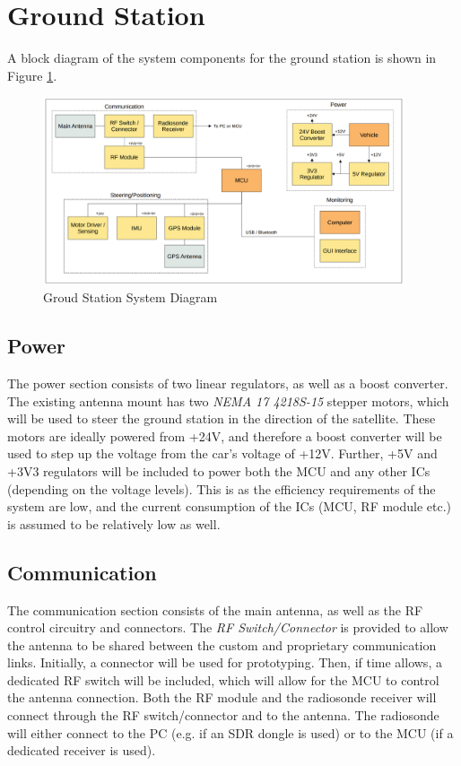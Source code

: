 \graphicspath{{./figures}}

\section{Ground Station}
A block diagram of the system components for the ground station is shown in Figure \ref{fig:gs_system}.

\begin{figure}[!htb]
  \centering
  \includegraphics[width=0.95\textwidth]{gs_system}
  \caption{Groud Station System Diagram}
  \label{fig:gs_system}
\end{figure}

\subsection{Power}
The power section consists of two linear regulators, as well as a boost converter. The existing antenna mount has two \textit{NEMA 17 4218S-15} stepper motors, which will be used to steer the ground station in the direction of the satellite. These motors are ideally powered from +24V, and therefore a boost converter will be used to step up the voltage from the car's voltage of +12V. Further, +5V and +3V3 regulators will be included to power both the MCU and any other ICs (depending on the voltage levels). This is as the efficiency requirements of the system are low, and the current consumption of the ICs (MCU, RF module etc.) is assumed to be relatively low as well.

\subsection{Communication}
The communication section consists of the main antenna, as well as the RF control circuitry and connectors. The \textit{RF Switch/Connector} is provided to allow the antenna to be shared between the custom and proprietary communication links. Initially, a connector will be used for prototyping. Then, if time allows, a dedicated RF switch will be included, which will allow for the MCU to control the antenna connection. Both the RF module and the radiosonde receiver will connect through the RF switch/connector and to the antenna. The radiosonde will either connect to the PC (e.g. if an SDR dongle is used) or to the MCU (if a dedicated receiver is used).

